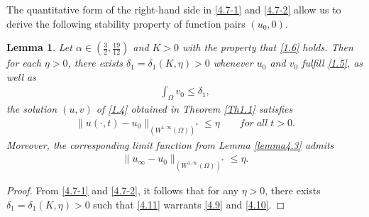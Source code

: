 \documentclass[12pt]{article}
\theoremstyle{plain}
\newtheorem{lemma}{Lemma}[section]
\theoremstyle{definition}
\numberwithin{equation}{section}
\begin{document}
The quantitative form of the right-hand side in \eqref{4.7-1} and \eqref{4.7-2} allow us to derive the following stability property  of function pairs $(u_0,0)$.
\begin{lemma}\label{lemma4.4}
Let $\alpha\in\left(\frac{3}{2},\frac{19}{12}\right)$ and $K>0$ with the property that \eqref{1.6} holds.  Then for each $\eta>0$, there exists $\delta_1=\delta_1(K,\eta)>0$ whenever $u_0$ and $v_0$ fulfill
\eqref{1.5}, as well as
\begin{align}\label{4.11}
    \int_{\Omega}v_0\leq \delta_1,
\end{align}
the solution $(u,v)$ of \eqref{1.4} obtained in Theorem \ref{Th1.1} satisfies
\begin{align}\label{4.9}
    \|u(\cdot,t)-u_0\|_{(W^{1,\infty}(\Omega))^*}\leq \eta\qquad for \;all\; t>0.
\end{align}
Moreover, the corresponding limit function  from Lemma \ref{lemma4.3} admits
\begin{align}\label{4.10}
   \|u_{\infty}-u_0\|_{(W^{1,\infty}(\Omega))^*}\leq \eta.
\end{align}
\end{lemma}
\begin{proof}
   From \eqref{4.7-1} and \eqref{4.7-2}, it follows that for any $\eta>0$,  there exists $\delta_1=\delta_1(K,\eta)>0$ such that \eqref{4.11} warrants \eqref{4.9} and \eqref{4.10}.
\end{proof}
\end{document}
